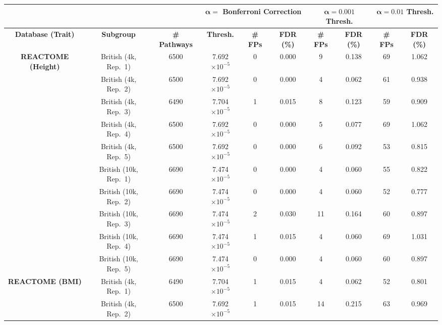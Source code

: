 \documentclass[10pt]{article}
\begin{document}
\begin{landscape}

\setlength{\extrarowheight}{3pt}

\begin{table}[ht]
\centering
\vspace*{-1.5cm}
\hspace*{-4em}
\begin{tabular}{|c|c|c|ccc|cc|cc|}
  \hline
& & & \multicolumn{3}{c|}{\textbf{$\bm{\alpha =}$ Bonferroni Correction}} & \multicolumn{2}{c|}{\textbf{$\bm{\alpha = 0.001}$ Thresh.}} & \multicolumn{2}{c|}{\textbf{$\bm{\alpha = 0.01}$ Thresh.}}\\
\hline
\textbf{Database (Trait)} & \textbf{Subgroup} & \textbf{\# Pathways} & \textbf{Thresh.} & \textbf{\# FPs} & \textbf{FDR (\%)} & \textbf{\# FPs} & \textbf{FDR (\%)} &  \textbf{\# FPs} & \textbf{FDR (\%)} \\ 
  \hline
\multirow{10.5}{*}{\textbf{REACTOME (Height)}} & British (4k, Rep.~1) & 6500 & 7.692$\times 10^{-5}$ & 0 & 0.000 & 9 & 0.138 & 69 & 1.062 \\
  & British (4k, Rep.~2) & 6500 & 7.692$\times 10^{-5}$ & 0 & 0.000 &  4 & 0.062 & 61 & 0.938 \\
  & British (4k, Rep.~3) & 6490 & 7.704$\times 10^{-5}$ & 1 & 0.015 & 8 & 0.123 & 59 & 0.909 \\
  & British (4k, Rep.~4) & 6500 & 7.692$\times 10^{-5}$ & 0 & 0.000 & 5 & 0.077 & 69 & 1.062 \\
  & British (4k, Rep.~5) & 6500 & 7.692$\times 10^{-5}$ & 0 & 0.000 & 6 & 0.092 & 53 & 0.815 \\
  & British (10k, Rep.~1) & 6690 & 7.474$\times 10^{-5}$ & 0 & 0.000 & 4 & 0.060 & 55 & 0.822 \\
  & British (10k, Rep.~2) & 6690 & 7.474$\times 10^{-5}$ & 0 & 0.000 & 4 & 0.060 & 52 & 0.777 \\
  & British (10k, Rep.~3) & 6690 & 7.474$\times 10^{-5}$ & 2 & 0.030 & 11 & 0.164 & 60 & 0.897 \\
  & British (10k, Rep.~4) & 6690 & 7.474$\times 10^{-5}$ & 1 & 0.015 & 4 & 0.060 & 69 & 1.031 \\
  & British (10k, Rep.~5) & 6690 & 7.474$\times 10^{-5}$ & 0 & 0.000 & 4 & 0.060 & 60 & 0.897 \\
   \hline
\multirow{10.5}{*}{\textbf{REACTOME (BMI)}} & British (4k, Rep.~1) & 6490 & 7.704$\times 10^{-5}$ & 1 & 0.015 & 4 & 0.062 & 52 & 0.801 \\
  & British (4k, Rep.~2) & 6500 & 7.692$\times 10^{-5}$ & 1 & 0.015 & 14 & 0.215 & 63 & 0.969 \\

\end{tabular}
\end{table}
\end{landscape}
\end{document}
